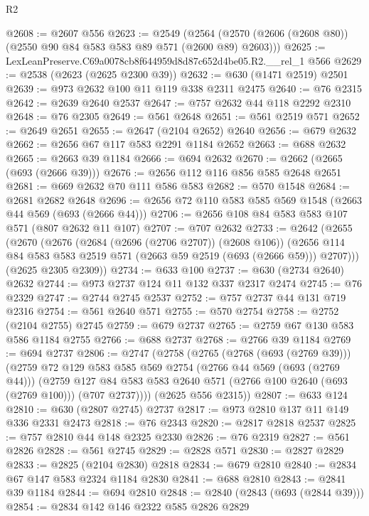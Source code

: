 \begin{lexlean}{R2}
\begin{coremodule}
@2608 := @2607 @556
@2623 := @2549
    (@2564 (@2570 (@2606 (@2608 @80)) (@2550 @90 @84 @583 @583 @89 @571 (@2600 @89) @2603)))
@2625 := LexLeanPreserve.C69a0078cb8f644959d8d87c652d4be05.R2.__rel_1 @566
@2629 := @2538 (@2623 (@2625 @2300 @39))
@2632 := @630 (@1471 @2519) @2501
@2639 := @973 @2632 @100 @11 @119 @338 @2311 @2475
@2640 := @76 @2315
@2642 := @2639 @2640 @2537
@2647 := @757 @2632 @44 @118 @2292 @2310
@2648 := @76 @2305
@2649 := @561 @2648
@2651 := @561 @2519 @571
@2652 := @2649 @2651
@2655 := @2647 (@2104 @2652) @2640
@2656 := @679 @2632
@2662 := @2656 @67 @117 @583 @2291 @1184 @2652
@2663 := @688 @2632
@2665 := @2663 @39 @1184
@2666 := @694 @2632
@2670 := @2662 (@2665 (@693 (@2666 @39)))
@2676 := @2656 @112 @116 @856 @585 @2648 @2651
@2681 := @669 @2632 @70 @111 @586 @583
@2682 := @570 @1548
@2684 := @2681 @2682 @2648
@2696 := @2656 @72 @110 @583 @585 @569 @1548 (@2663 @44 @569 (@693 (@2666 @44)))
@2706 := @2656 @108 @84 @583 @583 @107 @571 (@807 @2632 @11 @107)
@2707 := @707 @2632
@2733 := @2642
    (@2655
      (@2670
        (@2676
          (@2684 (@2696 (@2706 @2707)) (@2608 @106))
          (@2656 @114 @84 @583 @583 @2519 @571 (@2663 @59 @2519 (@693 (@2666 @59))) @2707)))
      (@2625 @2305 @2309))
@2734 := @633 @100
@2737 := @630 (@2734 @2640) @2632
@2744 := @973 @2737 @124 @11 @132 @337 @2317 @2474
@2745 := @76 @2329
@2747 := @2744 @2745 @2537
@2752 := @757 @2737 @44 @131 @719 @2316
@2754 := @561 @2640 @571
@2755 := @570 @2754
@2758 := @2752 (@2104 @2755) @2745
@2759 := @679 @2737
@2765 := @2759 @67 @130 @583 @586 @1184 @2755
@2766 := @688 @2737
@2768 := @2766 @39 @1184
@2769 := @694 @2737
@2806 := @2747
    (@2758
      (@2765
        (@2768 (@693 (@2769 @39)))
        (@2759
          @72
          @129
          @583
          @585
          @569
          @2754
          (@2766 @44 @569 (@693 (@2769 @44)))
          (@2759
            @127
            @84
            @583
            @583
            @2640
            @571
            (@2766 @100 @2640 (@693 (@2769 @100)))
            (@707 @2737))))
      (@2625 @556 @2315))
@2807 := @633 @124
@2810 := @630 (@2807 @2745) @2737
@2817 := @973 @2810 @137 @11 @149 @336 @2331 @2473
@2818 := @76 @2343
@2820 := @2817 @2818 @2537
@2825 := @757 @2810 @44 @148 @2325 @2330
@2826 := @76 @2319
@2827 := @561 @2826
@2828 := @561 @2745
@2829 := @2828 @571
@2830 := @2827 @2829
@2833 := @2825 (@2104 @2830) @2818
@2834 := @679 @2810
@2840 := @2834 @67 @147 @583 @2324 @1184 @2830
@2841 := @688 @2810
@2843 := @2841 @39 @1184
@2844 := @694 @2810
@2848 := @2840 (@2843 (@693 (@2844 @39)))
@2854 := @2834 @142 @146 @2322 @585 @2826 @2829

\end{coremodule}
\end{lexlean}
